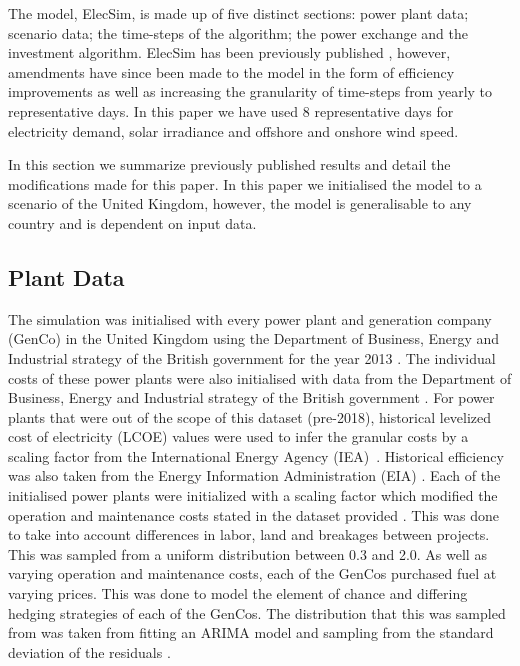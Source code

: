 \documentclass[final,3p,times,twocolumn,numbers]{elsarticle}
\begin{document}
The model, ElecSim, is made up of five distinct sections: power plant data; scenario data; the time-steps of the algorithm; the power exchange and the investment algorithm. ElecSim has been previously published \cite{Kell}, however, amendments have since been made to the model in the form of efficiency improvements as well as increasing the granularity of time-steps from yearly to representative days. In this paper we have used 8 representative days for electricity demand, solar irradiance and offshore and onshore wind speed.

In this section we summarize previously published results and detail the modifications made for this paper. In this paper we initialised the model to a scenario of the United Kingdom, however, the model is generalisable to any country and is dependent on input data.

\subsection{Plant Data}

The simulation was initialised with every power plant and generation company (GenCo) in the United Kingdom using the Department of Business, Energy and Industrial strategy of the British government for the year 2013 \cite{dukes_511}. The individual costs of these power plants were also initialised with data from the Department of Business, Energy and Industrial strategy of the British government \cite{Department2016}. For power plants that were out of the scope of this dataset (pre-2018), historical levelized cost of electricity (LCOE) values were used to infer the granular costs by a scaling factor from the International Energy Agency (IEA)~\cite{IEA2015}. Historical efficiency was also taken from the Energy Information Administration (EIA) \cite{eia_efficiency}. Each of the initialised power plants were initialized with a scaling factor which modified the operation and maintenance costs stated in the dataset provided \cite{Department2016}. This was done to take into account differences in labor, land and breakages between projects. This was sampled from a uniform distribution between 0.3 and 2.0. As well as varying operation and maintenance costs, each of the GenCos purchased fuel at varying prices. This was done to model the element of chance and differing hedging strategies of each of the GenCos. The distribution that this was sampled from was taken from fitting an ARIMA model and sampling from the standard deviation of the residuals \cite{ARIMA}.
\end{document}

